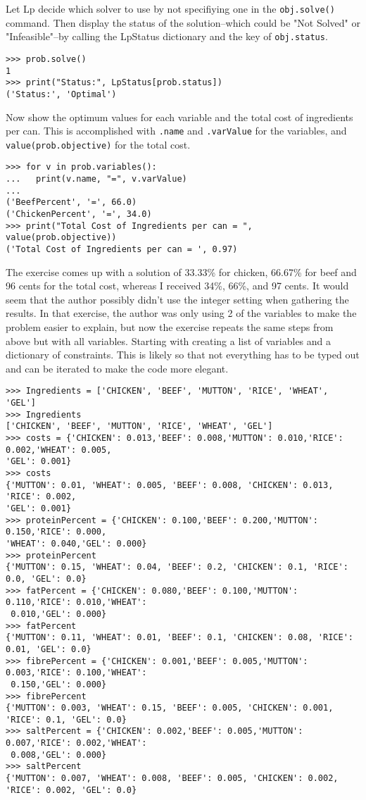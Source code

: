 \documentclass[10pt]{article}
\begin{document}
Let Lp decide which solver to use by not specifiying one in the \verb|obj.solve()| command. Then display the status of the solution--which could be "Not Solved" or "Infeasible"--by calling the LpStatus dictionary and the key of \verb|obj.status|.
\begin{verbatim}
>>> prob.solve()
1
>>> print("Status:", LpStatus[prob.status])
('Status:', 'Optimal')
\end{verbatim}
Now show the optimum values for each variable and the total cost of ingredients per can. This is accomplished with \verb|.name| and \verb|.varValue| for the variables, and \verb|value(prob.objective)| for the total cost.
\begin{verbatim}
>>> for v in prob.variables():
...   print(v.name, "=", v.varValue)
... 
('BeefPercent', '=', 66.0)
('ChickenPercent', '=', 34.0)
>>> print("Total Cost of Ingredients per can = ", value(prob.objective))
('Total Cost of Ingredients per can = ', 0.97)
\end{verbatim}
The exercise comes up with a solution of 33.33\% for chicken, 66.67\% for beef and 96 cents for the total cost, whereas I received 34\%, 66\%, and 97 cents. It would seem that the author possibly didn't use the integer setting when gathering the results. In that exercise, the author was only using 2 of the variables to make the problem easier to explain, but now the exercise repeats the same steps from above but with all variables. Starting with creating a list of variables and a dictionary of constraints. This is likely so that not everything has to be typed out and can be iterated to make the code more elegant. 
\begin{verbatim}
>>> Ingredients = ['CHICKEN', 'BEEF', 'MUTTON', 'RICE', 'WHEAT', 'GEL']
>>> Ingredients
['CHICKEN', 'BEEF', 'MUTTON', 'RICE', 'WHEAT', 'GEL']
>>> costs = {'CHICKEN': 0.013,'BEEF': 0.008,'MUTTON': 0.010,'RICE': 0.002,'WHEAT': 0.005,
'GEL': 0.001}
>>> costs
{'MUTTON': 0.01, 'WHEAT': 0.005, 'BEEF': 0.008, 'CHICKEN': 0.013, 'RICE': 0.002, 
'GEL': 0.001}
>>> proteinPercent = {'CHICKEN': 0.100,'BEEF': 0.200,'MUTTON': 0.150,'RICE': 0.000,
'WHEAT': 0.040,'GEL': 0.000}
>>> proteinPercent
{'MUTTON': 0.15, 'WHEAT': 0.04, 'BEEF': 0.2, 'CHICKEN': 0.1, 'RICE': 0.0, 'GEL': 0.0}
>>> fatPercent = {'CHICKEN': 0.080,'BEEF': 0.100,'MUTTON': 0.110,'RICE': 0.010,'WHEAT':
 0.010,'GEL': 0.000}
>>> fatPercent
{'MUTTON': 0.11, 'WHEAT': 0.01, 'BEEF': 0.1, 'CHICKEN': 0.08, 'RICE': 0.01, 'GEL': 0.0}
>>> fibrePercent = {'CHICKEN': 0.001,'BEEF': 0.005,'MUTTON': 0.003,'RICE': 0.100,'WHEAT':
 0.150,'GEL': 0.000}
>>> fibrePercent
{'MUTTON': 0.003, 'WHEAT': 0.15, 'BEEF': 0.005, 'CHICKEN': 0.001, 'RICE': 0.1, 'GEL': 0.0}
>>> saltPercent = {'CHICKEN': 0.002,'BEEF': 0.005,'MUTTON': 0.007,'RICE': 0.002,'WHEAT':
 0.008,'GEL': 0.000}
>>> saltPercent
{'MUTTON': 0.007, 'WHEAT': 0.008, 'BEEF': 0.005, 'CHICKEN': 0.002, 'RICE': 0.002, 'GEL': 0.0}
\end{verbatim}
\end{document}
